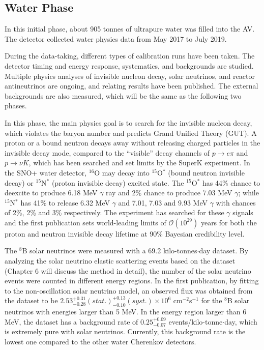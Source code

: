 \subsection{Water Phase} \label{sect:waterPhase}
In this initial phase, about 905 tonnes of ultrapure water was filled into the AV. The detector collected water physics data from May 2017 to July 2019.

During the data-taking, different types of calibration runs have been taken. The detector timing and energy response, systematics, and backgrounds are studied. Multiple physics analyses of invisible nucleon decay, solar neutrinos, and reactor antineutrinos are ongoing, and relating results have been published\cite{anderson2019search,anderson2019measurement,anderson2020measurement,anderson2021optical}. The external backgrounds are also measured, which will be the same as the following two phases.

In this phase, the main physics goal is to search for the invisible nucleon decay, which violates the baryon number and predicts Grand Unified Theory (GUT).  A proton or a bound neutron decays away without releasing charged particles in the invisible decay mode, compared to the ``visible'' decay channels of $p\to e\pi$ and $p\to\nu K$, which has been searched and set limits by the SuperK experiment. In the SNO+ water detector, $^{16}$O may decay into $^{15}$O$^*$ (bound neutron invisible decay) or $ ^{15}$N$^*$ (proton invisible decay) excited state. The $^{15}$O$^*$ has 44\% chance to deexcite to produce 6.18 MeV $\gamma$ ray and 2\% chance to produce 7.03 MeV $\gamma$; while $^{15}$N$^*$ has 41\% to release 6.32 MeV $\gamma$ and 7.01, 7.03 and 9.93 MeV $\gamma$ with chances of 2\%, 2\% and 3\% respectively. The experiment has searched for these $\gamma$ signals and the first publication sets world-leading limits of $\mathcal{O}(10^{29})$ years for both the proton and neutron invisible decay lifetime at 90\% Bayesian credibility level\cite{anderson2019search}. 

The $^8$B solar neutrinos were measured with a 69.2 kilo-tonnes$\cdot$day dataset. By analyzing the solar neutrino elastic scattering events based on the dataset (Chapter 6 will discuss the method in detail), the number of the solar neutrino events were counted in different energy regions. In the first publication\cite{anderson2019measurement}, by fitting to the non-oscillation solar neutrino model, an observed flux was obtained from the dataset to be $2.53^{+0.31}_{-0.28}(stat.)^{+0.13}_{-0.10}(syst.)\times 10^6$ cm$^{-2}$s$^{-1}$ for the $^8$B solar neutrinos with energies larger than 5 MeV. In the energy region larger than 6 MeV, the dataset has a background rate of $0.25^{+0.09}_{-0.07}$ events/kilo-tonne$\cdot$day, which is extremely pure with solar neutrinos. Currently, this background rate is the lowest one compared to the other water Cherenkov detectors\cite{anderson2019measurement}. 

